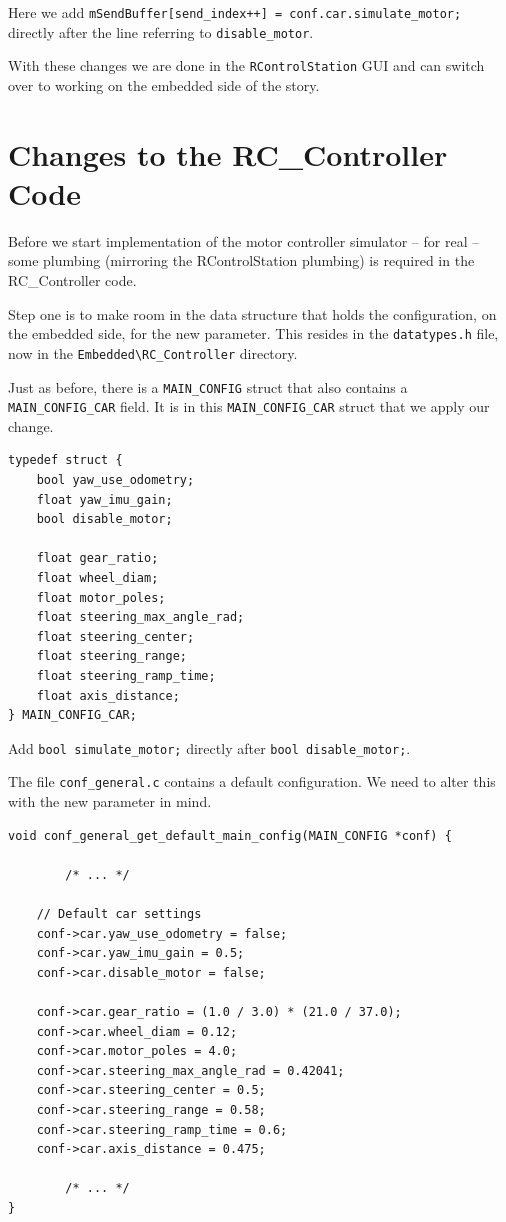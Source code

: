 \documentclass[12pt]{article} %
\newcommand{\change}[0]{\noindent{\hl {\b CODE CHANGE:}}}
\begin{document}
\change{} Here we add {\verb!mSendBuffer[send_index++] = conf.car.simulate_motor;!} directly
after the line referring to {\verb!disable_motor!}.

With these changes we are done in the {\verb!RControlStation!} GUI and
can switch over to working on the embedded side of the story. 

\section{Changes to the RC\_Controller Code}

Before we start implementation of the motor controller simulator -- for real --
some plumbing (mirroring the RControlStation plumbing) is required in
the RC\_Controller code.


Step one is to make room in the data structure that holds the configuration,
on the embedded side, for the new parameter. This resides in the {\verb!datatypes.h!} file,
now in the {\verb!Embedded\RC_Controller!} directory.

Just as before, there is a {\verb!MAIN_CONFIG!} struct that also contains a
{\verb!MAIN_CONFIG_CAR!} field. It is in this {\verb!MAIN_CONFIG_CAR!} struct that we apply our change. 

\begin{Verbatim}[samepage=true,frame=single,label=Embedded/RC\_Controller/datatypes.c]
typedef struct {
	bool yaw_use_odometry; 
	float yaw_imu_gain; 
	bool disable_motor;

	float gear_ratio;
	float wheel_diam;
	float motor_poles;
	float steering_max_angle_rad; 
	float steering_center;
	float steering_range;
	float steering_ramp_time; 
	float axis_distance;
} MAIN_CONFIG_CAR;
\end{Verbatim}

\change Add {\verb!bool simulate_motor;!} directly after {\verb!bool disable_motor;!}.


The file {\verb!conf_general.c!} contains a default configuration. We need to
alter this with the new parameter in mind. 

\begin{Verbatim}[samepage=true,frame=single,label=Embedded/RC\_Controller/conf\_general.c]
void conf_general_get_default_main_config(MAIN_CONFIG *conf) {

        /* ... */ 

	// Default car settings
	conf->car.yaw_use_odometry = false;
	conf->car.yaw_imu_gain = 0.5;
	conf->car.disable_motor = false;

	conf->car.gear_ratio = (1.0 / 3.0) * (21.0 / 37.0);
	conf->car.wheel_diam = 0.12;
	conf->car.motor_poles = 4.0;
	conf->car.steering_max_angle_rad = 0.42041;
	conf->car.steering_center = 0.5;
	conf->car.steering_range = 0.58;
	conf->car.steering_ramp_time = 0.6;
	conf->car.axis_distance = 0.475;

        /* ... */ 
}
\end{Verbatim}
\end{document}
